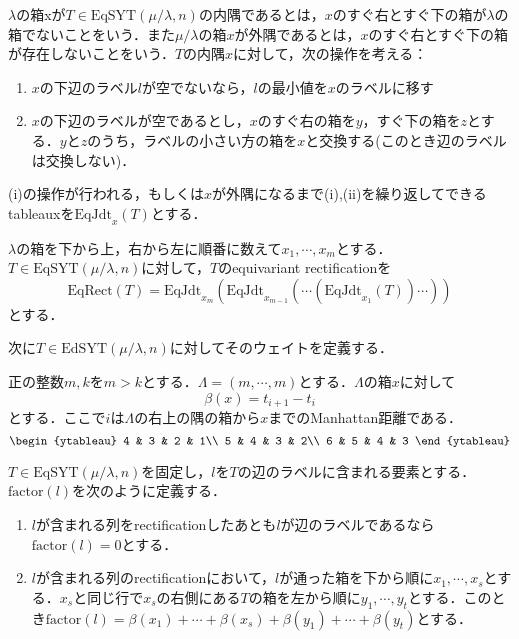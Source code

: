 \begin{defin}
  $\lambda$の箱xが$T\in\text{EqSYT}(\mu/\lambda, n)$の内隅であるとは，$x$のすぐ右とすぐ下の箱が$\lambda$の箱でないことをいう．また$\mu/\lambda$の箱$x$が外隅であるとは，$x$のすぐ右とすぐ下の箱が存在しないことをいう．$T$の内隅$x$に対して，次の操作を考える：
  \begin{enumerate}
    \item $x$の下辺のラベル$l$が空でないなら，$l$の最小値を$x$のラベルに移す
    \item $x$の下辺のラベルが空であるとし，$x$のすぐ右の箱を$y$，すぐ下の箱を$z$とする．$y$と$z$のうち，ラベルの小さい方の箱を$x$と交換する(このとき辺のラベルは交換しない)．
  \end{enumerate}
  (i)の操作が行われる，もしくは$x$が外隅になるまで(i),(ii)を繰り返してできるtableauxを$\text{EqJdt}_x(T)$とする．
\end{defin}

\begin{defin}
  $\lambda$の箱を下から上，右から左に順番に数えて$x_1,\cdots,x_m$とする．$T\in\text{EqSYT}(\mu/\lambda, n)$に対して，$T$のequivariant rectificationを
  \[
  \text{EqRect}(T)=\text{EqJdt}_{x_m}(\text{EqJdt}_{x_{m-1}}(\cdots(\text{EqJdt}_{x_1}(T))\cdots))
  \]
  とする．
\end{defin}

次に$T\in\text{EdSYT}(\mu/\lambda, n)$に対してそのウェイトを定義する．

\begin{defin}
  正の整数$m, k$を$m>k$とする．$\Lambda=(m,\cdots,m)$とする．$\Lambda$の箱$x$に対して
  \[
  \beta(x)=t_{i+1}-t_i
  \]
  とする．ここで$i$は$\Lambda$の右上の隅の箱から$x$までのManhattan距離である．
  \[
  \begin{ytableau}
    4 & 3 & 2 & 1\\
    5 & 4 & 3 & 2\\
    6 & 5 & 4 & 3
  \end{ytableau}
  \]
\end{defin}

\begin{defin}
  $T\in\text{EqSYT}(\mu/\lambda, n)$を固定し，$l$を$T$の辺のラベルに含まれる要素とする．$\text{factor}(l)$を次のように定義する．
  \begin{enumerate}
    \item $l$が含まれる列をrectificationしたあとも$l$が辺のラベルであるなら$\text{factor}(l)=0$とする．
    \item $l$が含まれる列のrectificationにおいて，$l$が通った箱を下から順に$x_1,\cdots,x_s$とする．$x_s$と同じ行で$x_s$の右側にある$T$の箱を左から順に$y_1,\cdots,y_t$とする．このとき$\text{factor}(l)=\beta(x_1)+\cdots+\beta(x_s)+\beta(y_1)+\cdots+\beta(y_t)$とする．
  \end{enumerate}
\end{defin}

